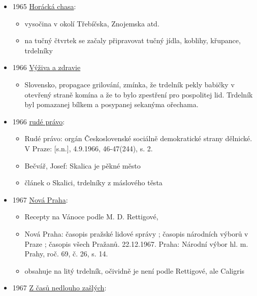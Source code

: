 \begin{itemize}
\tightlist
\item
  1965
  \href{https://ndk.cz/uuid/uuid:e1a51a10-09d1-11ea-a20e-005056827e51}{Horácká
  chasa}:

  \begin{itemize}
  \tightlist
  \item
    vysočina v okolí Třebíčska, Znojemska atd.
  \item
    na tučný čtvrtek se začaly připravovat tučný jídla, koblihy,
    křupance, trdelníky
  \end{itemize}
\item
  1966
  \href{https://dikda.snk.sk/uuid/uuid:656263cf-a9ec-466d-81b8-5a1ffef20756}{Výživa
  a zdravie}

  \begin{itemize}
  \tightlist
  \item
    Slovensko, propagace grilování, zmínka, že trdelník pekly babičky v
    otevřený straně komína a že to bylo zpestření pro pospolitej lid.
    Trdelník byl pomazanej bílkem a posypanej sekanýma ořechama.
  \end{itemize}
\item
  1966
  \href{https://ndk.cz/uuid/uuid:6fc6e800-b623-11dd-aa80-000d606f5dc6}{rudé
  právo}:

  \begin{itemize}
  \tightlist
  \item
    Rudé právo: orgán Československé sociálně demokratické strany
    dělnické. V Praze: {[}s.n.{]}, 4.9.1966, 46-47(244), s. 2.
  \item
    Bečvář, Josef: Skalica je pěkné město
  \item
    článek o Skalici, trdelníky z máslového těsta
  \end{itemize}
\item
  1967
  \href{https://www.digitalniknihovna.cz/mlp/uuid/uuid:74183168-068d-4b61-b179-c523b590abba}{Nová
  Praha}:

  \begin{itemize}
  \tightlist
  \item
    Recepty na Vánoce podle M. D. Rettigové,
  \item
    Nová Praha: časopis pražské lidové správy ; časopis národních výborů
    v Praze ; časopis všech Pražanů. 22.12.1967. Praha: Národní výbor
    hl. m. Prahy, roč. 69, č. 26, s. 14.
  \item
    obsahuje  na litý trdelník, očividně je není podle
    Rettigové, ale Caligris
  \end{itemize}
\item
  1967
  \href{https://ndk.cz/uuid/uuid:cfdaf360-40b0-11f0-9163-5ef3fc9bb22f}{Z
  časů nedlouho zašlých}:


\end{itemize}
